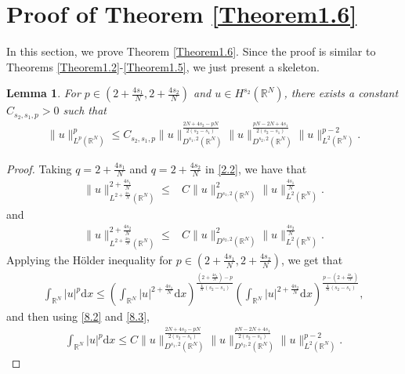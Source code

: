 \documentclass[12pt,a4paper,reqno]{amsart}
\numberwithin{equation}{section}
\newtheorem{lemma}{Lemma}[section]
\begin{document}
\section{Proof of Theorem \ref{Theorem1.6}}
In this section,
we prove Theorem \ref{Theorem1.6}.
Since the proof is similar to Theorems \ref{Theorem1.2}-\ref{Theorem1.5},
we just present a skeleton.
\begin{lemma}\label{Lemma8.1}
For $p\in(2+\frac{4s_{1}}{N},2+\frac{4s_{2}}{N})$ and $u\in H^{s_{2}}(\mathbb{R}^{N})$,
there exists a constant $C_{s_{2},s_{1},p}>0$ such that
\begin{equation}\label{8.1}
\begin{aligned}
\|u\|_{L^{p}(\mathbb{R}^{N})}^{p}
\leqslant C_{s_{2},s_{1},p}
\|u\|_{D^{s_{1},2}(\mathbb{R}^{N})}^{\frac{2N+4s_{2}-pN}{2(s_{2}-s_{1})}}
\|u\|_{D^{s_{2},2}(\mathbb{R}^{N})}^{\frac{pN-2N+4s_{1}}{2(s_{2}-s_{1})}}
\|u\|_{L^{2}(\mathbb{R}^{N})}^{p-2}.
\end{aligned}
\end{equation}
\end{lemma}
\begin{proof}
Taking $q=2+\frac{4s_{1}}{N}$ and  $q=2+\frac{4s_{2}}{N}$ in \eqref{2.2}, we have that
\begin{equation}\label{8.2}
\begin{aligned}
\|u\|_{L^{2+\frac{4s_{1}}{N}}(\mathbb{R}^{N})}^{2+\frac{4s_{1}}{N}}
\leqslant&
C
\|u\|_{D^{s_{1},2}(\mathbb{R}^{N})}^{2}
\|u\|_{L^{2}(\mathbb{R}^{N})}^{\frac{4s_{1}}{N}}.
\end{aligned}
\end{equation}
and
\begin{equation}\label{8.3}
\begin{aligned}
\|u\|_{L^{2+\frac{4s_{2}}{N}}(\mathbb{R}^{N})}^{2+\frac{4s_{2}}{N}}
\leqslant&
C
\|u\|_{D^{s_{2},2}(\mathbb{R}^{N})}^{2}
\|u\|_{L^{2}(\mathbb{R}^{N})}^{\frac{4s_{2}}{N}}.
\end{aligned}
\end{equation}
Applying the H\"{o}lder inequality for $p\in(2+\frac{4s_{1}}{N},2+\frac{4s_{2}}{N})$, we get that
\begin{equation*}
\begin{aligned}
\int_{\mathbb{R}^{N}}|u|^{p}\mathrm{d}x
\leqslant
\left(
\int_{\mathbb{R}^{N}}
|u|^{2+\frac{4s_{1}}{N}}
\mathrm{d}x
\right)^{\frac{(2+\frac{4s_{2}}{N})-p}{\frac{4}{N}(s_{2}-s_{1})}}
\left(
\int_{\mathbb{R}^{N}}
|u|^{2+\frac{4s_{2}}{N}}
\mathrm{d}x
\right)^{\frac{p-(2+\frac{4s_{1}}{N})}{\frac{4}{N}(s_{2}-s_{1})}},
\end{aligned}
\end{equation*}
and then using \eqref{8.2} and \eqref{8.3},
\begin{equation*}
\begin{aligned}
\int_{\mathbb{R}^{N}}|u|^{p}\mathrm{d}x
\leqslant C
\|u\|_{D^{s_{1},2}(\mathbb{R}^{N})}^{\frac{2N+4s_{2}-pN}{2(s_{2}-s_{1})}}
\|u\|_{D^{s_{2},2}(\mathbb{R}^{N})}^{\frac{pN-2N+4s_{1}}{2(s_{2}-s_{1})}}
\|u\|_{L^{2}(\mathbb{R}^{N})}^{p-2}.
\end{aligned}
\end{equation*}
\end{proof}
\end{document}
